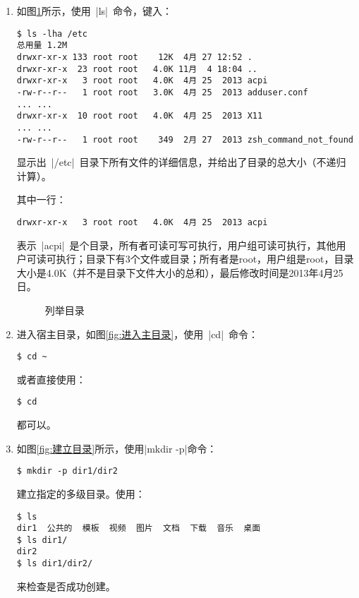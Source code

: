 \documentclass[cs4size,a4paper,nofonts]{ctexart}
\begin{document}
\begin{enumerate}

\item 如图\ref{fig:列举目录}所示，使用~|ls|~命令，键入：
\begin{Verbatim}
$ ls -lha /etc
总用量 1.2M
drwxr-xr-x 133 root root    12K  4月 27 12:52 .
drwxr-xr-x  23 root root   4.0K 11月  4 18:04 ..
drwxr-xr-x   3 root root   4.0K  4月 25  2013 acpi
-rw-r--r--   1 root root   3.0K  4月 25  2013 adduser.conf
... ...
drwxr-xr-x  10 root root   4.0K  4月 25  2013 X11
... ...
-rw-r--r--   1 root root    349  2月 27  2013 zsh_command_not_found
\end{Verbatim}
显示出~|/etc|~目录下所有文件的详细信息，并给出了目录的总大小（不递归计算）。

其中一行：
\begin{verbatim}
drwxr-xr-x   3 root root   4.0K  4月 25  2013 acpi
\end{verbatim}
表示~|acpi|~是个目录，所有者可读可写可执行，用户组可读可执行，其他用户可读可执行；目录下有3个文件或目录；所有者是root，用户组是root，目录大小是4.0K（并不是目录下文件大小的总和），最后修改时间是2013年4月25日。

\begin{figure}[htp]
\caption{列举目录}\label{fig:列举目录}
\end{figure}

\item 进入宿主目录，如图\ref{fig:进入主目录}，使用~|cd|~命令：
\begin{Verbatim}
$ cd ~
\end{Verbatim}
或者直接使用：
\begin{Verbatim}
$ cd
\end{Verbatim}
都可以。

\begin{figure}[htp]
\end{figure}

\item 如图\ref{fig:建立目录}所示，使用|mkdir -p|命令：
\begin{Verbatim}
$ mkdir -p dir1/dir2
\end{Verbatim}
建立指定的多级目录。使用：
\begin{Verbatim}
$ ls
dir1  公共的  模板  视频  图片  文档  下载  音乐  桌面
$ ls dir1/
dir2
$ ls dir1/dir2/
\end{Verbatim}
来检查是否成功创建。


\end{enumerate}
\end{document}
